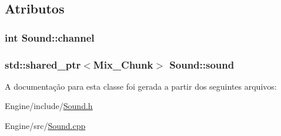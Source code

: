 \subsection{Atributos}
\hypertarget{classSound_af3895edf5a39772f1de32cfbfff90909}{
\subsubsection[{channel}]{\setlength{\rightskip}{0pt plus 5cm}int Sound\+::channel\hspace{0.3cm}{\ttfamily [private]}}}\label{classSound_af3895edf5a39772f1de32cfbfff90909}
\hypertarget{classSound_a44bbda770ac76c7455b60d3d63b663a7}{
\subsubsection[{sound}]{\setlength{\rightskip}{0pt plus 5cm}std\+::shared\+\_\+ptr$<$Mix\+\_\+\+Chunk$>$ Sound\+::sound\hspace{0.3cm}{\ttfamily [private]}}}\label{classSound_a44bbda770ac76c7455b60d3d63b663a7}


A documentação para esta classe foi gerada a partir dos seguintes arquivos\+:\begin{DoxyCompactItemize}
\item 
Engine/include/\hyperlink{Sound_8h}{Sound.\+h}\item 
Engine/src/\hyperlink{Sound_8cpp}{Sound.\+cpp}\end{DoxyCompactItemize}
